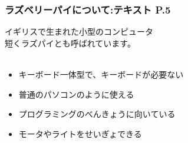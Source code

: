 \documentclass[dvipdfmx]{beamer}
\begin{document}
\begin{frame}[fragile]
	\frametitle{ラズベリーパイについて:テキスト P.5~~~}
	イギリスで生まれた小型のコンピュータ\\
	短くラズパイとも呼ばれています。\\
			 ~\\
			\vfill
				\begin{itemize}
					\item キーボード一体型で、キーボードが必要ない
					\item 普通のパソコンのように使える
					\item プログラミングのべんきょうに向いている
					\item モータやライトをせいぎょできる
				\end{itemize}
\end{frame}
\end{document}
